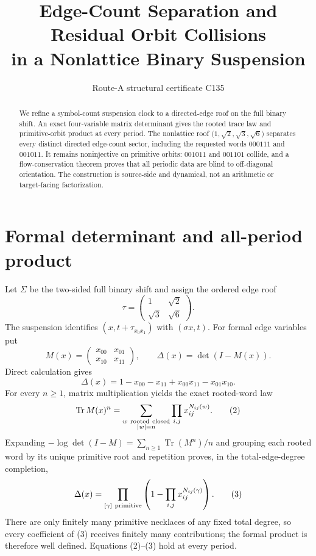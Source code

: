 \documentclass[10pt]{article}
\title{Edge-Count Separation and Residual Orbit Collisions\\
in a Nonlattice Binary Suspension}
\author{Route-A structural certificate C135}
\date{}
\begin{document}
\maketitle
\begin{abstract}
We refine a symbol-count suspension clock to a directed-edge roof on the full
binary shift.  An exact four-variable matrix determinant gives the rooted
trace law and primitive-orbit product at every period.  The nonlattice roof
$\bigl(1,\sqrt2,\sqrt3,\sqrt6\bigr)$ separates every distinct directed
edge-count sector, including the requested words $000111$ and $001011$.
It remains noninjective on primitive orbits: $001011$ and $001101$ collide,
and a flow-conservation theorem proves that all periodic data are blind to
off-diagonal orientation.  The construction is source-side and dynamical,
not an arithmetic or target-facing factorization.
\end{abstract}

\section{Formal determinant and all-period product}
Let $\Sigma$ be the two-sided full binary shift and assign the ordered edge
roof
\[
\tau=\begin{pmatrix}1&\sqrt2\\ \sqrt3&\sqrt6\end{pmatrix}.
\]
The suspension identifies $(x,t+\tau_{x_0x_1})$ with $(\sigma x,t)$.  For
formal edge variables put
\[
M(x)=\begin{pmatrix}x_{00}&x_{01}\\x_{10}&x_{11}\end{pmatrix},\qquad
\Delta(x)=\det(I-M(x)).
\]
Direct calculation gives
\begin{equation}
\Delta(x)=1-x_{00}-x_{11}+x_{00}x_{11}-x_{01}x_{10}. \tag{1}
\end{equation}
For every $n\geq1$, matrix multiplication yields the exact rooted-word law
\begin{equation}
\operatorname{Tr}M(x)^n=\sum_{\substack{w\ {\rm rooted\ closed}\\|w|=n}}
\prod_{i,j}x_{ij}^{N_{ij}(w)}. \tag{2}
\end{equation}
Expanding $-\log\det(I-M)=\sum_{n\geq1}\operatorname{Tr}(M^n)/n$ and
grouping each rooted word by its unique primitive root and repetition proves,
in the total-edge-degree completion,
\begin{equation}
\Delta(x)=\prod_{[\gamma]\ {\rm primitive}}
\left(1-\prod_{i,j}x_{ij}^{N_{ij}(\gamma)}\right). \tag{3}
\end{equation}
There are only finitely many primitive necklaces of any fixed total degree,
so every coefficient of (3) receives finitely many contributions; the formal
product is therefore well defined.  Equations (2)--(3) hold at every period.
\end{document}
